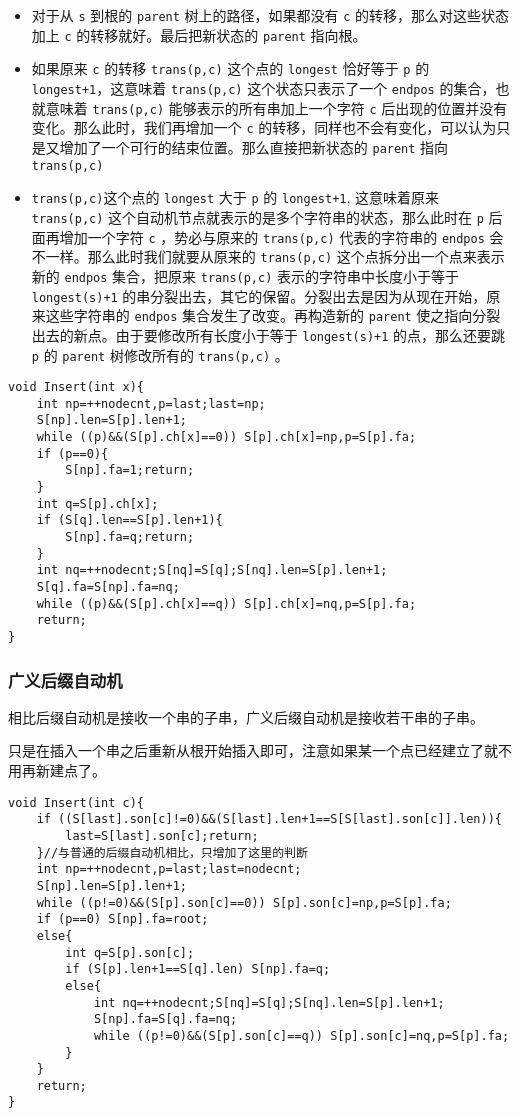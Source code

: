 \documentclass[UTF-8]{ctexart}
\begin{document}
	\begin{itemize}
		\item 对于从 \texttt{s} 到根的 \texttt{parent} 树上的路径，如果都没有 \texttt{c} 的转移，那么对这些状态加上 \texttt{c} 的转移就好。最后把新状态的 \texttt{parent} 指向根。
		\item 如果原来 \texttt{c} 的转移 \texttt{trans(p,c)} 这个点的 \texttt{longest} 恰好等于 \texttt{p} 的 \texttt{longest+1}，这意味着 \texttt{trans(p,c)} 这个状态只表示了一个 \texttt{endpos} 的集合，也就意味着 \texttt{trans(p,c)} 能够表示的所有串加上一个字符 \texttt{c} 后出现的位置并没有变化。那么此时，我们再增加一个 \texttt{c} 的转移，同样也不会有变化，可以认为只是又增加了一个可行的结束位置。那么直接把新状态的 \texttt{parent} 指向 \texttt{trans(p,c)}
		\item \texttt{trans(p,c)}这个点的 \texttt{longest} 大于 \texttt{p} 的 \texttt{longest+1}, 这意味着原来 \texttt{trans(p,c)} 这个自动机节点就表示的是多个字符串的状态，那么此时在 \texttt{p} 后面再增加一个字符 \texttt{c} ，势必与原来的 \texttt{trans(p,c)} 代表的字符串的 \texttt{endpos} 会不一样。那么此时我们就要从原来的 \texttt{trans(p,c)} 这个点拆分出一个点来表示新的 \texttt{endpos} 集合，把原来 \texttt{trans(p,c)} 表示的字符串中长度小于等于 \texttt{longest(s)+1} 的串分裂出去，其它的保留。分裂出去是因为从现在开始，原来这些字符串的 \texttt{endpos} 集合发生了改变。再构造新的 \texttt{parent} 使之指向分裂出去的新点。由于要修改所有长度小于等于 \texttt{longest(s)+1} 的点，那么还要跳 \texttt{p} 的 \texttt{parent} 树修改所有的 \texttt{trans(p,c)} 。
	\end{itemize}
\begin{verbatim}
void Insert(int x){
    int np=++nodecnt,p=last;last=np;
    S[np].len=S[p].len+1;
    while ((p)&&(S[p].ch[x]==0)) S[p].ch[x]=np,p=S[p].fa;
    if (p==0){
        S[np].fa=1;return;
    }
    int q=S[p].ch[x];
    if (S[q].len==S[p].len+1){
        S[np].fa=q;return;
    }
    int nq=++nodecnt;S[nq]=S[q];S[nq].len=S[p].len+1;
    S[q].fa=S[np].fa=nq;
    while ((p)&&(S[p].ch[x]==q)) S[p].ch[x]=nq,p=S[p].fa;
    return;
}
\end{verbatim}
	\subsubsection{广义后缀自动机}
	相比后缀自动机是接收一个串的子串，广义后缀自动机是接收若干串的子串。
	
	只是在插入一个串之后重新从根开始插入即可，注意如果某一个点已经建立了就不用再新建点了。
\begin{verbatim}
void Insert(int c){
    if ((S[last].son[c]!=0)&&(S[last].len+1==S[S[last].son[c]].len)){
        last=S[last].son[c];return;
    }//与普通的后缀自动机相比，只增加了这里的判断
    int np=++nodecnt,p=last;last=nodecnt;
    S[np].len=S[p].len+1;
    while ((p!=0)&&(S[p].son[c]==0)) S[p].son[c]=np,p=S[p].fa;
    if (p==0) S[np].fa=root;
    else{
        int q=S[p].son[c];
        if (S[p].len+1==S[q].len) S[np].fa=q;
        else{
            int nq=++nodecnt;S[nq]=S[q];S[nq].len=S[p].len+1;
            S[np].fa=S[q].fa=nq;
            while ((p!=0)&&(S[p].son[c]==q)) S[p].son[c]=nq,p=S[p].fa;
        }
    }
    return;
}
\end{verbatim}
	\newpage
\end{document}

